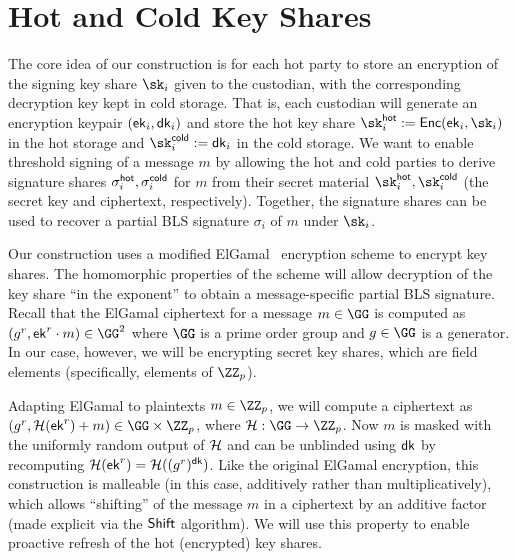 \section{Hot and Cold Key Shares}\label{sec:keyshares}

The core idea of our construction is for each hot party to store an encryption of the signing key share $\sk_i$ given to the custodian, with the corresponding decryption key kept in cold storage.
That is, each custodian will generate an encryption keypair $(\mathsf{ek}_i, \mathsf{dk}_i)$ and store the hot key share $\sk_i^\hot := \enc(\ek_i, \sk_i)$ in the hot storage and $\sk_i^\cold := \dk_i$ in the cold storage.
We want to enable threshold signing of a message $m$ by allowing the hot and cold parties to derive signature shares $\sigma_i^{\mathsf{hot}}, \sigma_i^{\mathsf{cold}}$ for $m$ from their secret material $\sk_i^\hot, \sk_i^\cold$ (the secret key and ciphertext, respectively). Together, the signature shares can be used to recover a partial BLS signature $\sigma_i$ of $m$ under $\sk_i$.

Our construction uses a modified ElGamal~\cite{C:ElGamal84} encryption scheme to encrypt key shares. The homomorphic properties of the scheme will allow decryption of the key share ``in the exponent'' to obtain a message-specific partial BLS signature.
Recall that the ElGamal ciphertext for a message $m \in \GG$ is computed as $(g^r, \ek^r \cdot m) \in \GG^2$ where $\GG$ is a prime order group and $g \in \GG$ is a generator. In our case, however, we will be encrypting secret key shares, which are field elements (specifically, elements of $\ZZ_p$).

Adapting ElGamal to plaintexts $m \in \ZZ_p$, we will compute a ciphertext as $(g^r, \lhlhash(\ek^r) + m) \in \GG \times \ZZ_p$, where $\lhlhash: \GG \to \ZZ_p$.
Now $m$ is masked with the uniformly random output of $\mathcal{H}$ and can be unblinded using $\mathsf{dk}$ by recomputing $\mathcal{H}(\mathsf{ek}^r) = \mathcal{H}((g^r)^{\mathsf{dk}})$.
Like the original ElGamal encryption, this construction is malleable (in this case, additively rather than multiplicatively), which allows ``shifting'' of the message $m$ in a ciphertext by an additive factor (made explicit via the $\sf Shift$ algorithm). We will use this property to enable proactive refresh of the hot (encrypted) key shares.

